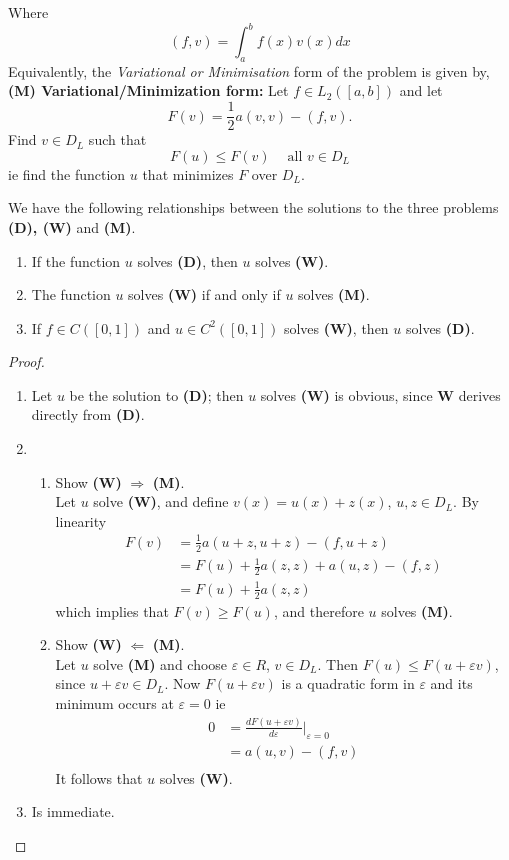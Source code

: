 Where 
\[(f,v) =\int_{a}^{b}f(x)v(x)dx \]
Equivalently, the \textit{Variational or Minimisation} form of the problem is given
by,\\ 
\textbf{(M) Variational/Minimization form:} Let $f\in L_2([a,b])$ and let
\[F(v)=\frac{1}{2}a(v,v)-(f,v).\]
Find $v \in D_L$ such that
\[F(u) \leq F(v) \ \ \ \ \mbox{ all } v\in D_L\]
ie find the function $u$ that minimizes $F$ over $D_L$.
\begin{theorem}
We have the following relationships between the solutions to the three problems
\textbf{(D), (W)} and \textbf{(M)}.
\begin{enumerate}
\item
If the function $u$ solves \textbf{(D)}, then $u$ solves \textbf{(W)}.
\item
The function $u$ solves \textbf{(W)} if and only if $u$ solves \textbf{(M)}.
\item
If $f\in C([0,1])$ and $u \in C^{2}([0,1])$ solves \textbf{(W)}, then $u$ solves \textbf{(D)}.
\end{enumerate}
\end{theorem}
\begin{proof}
\begin{enumerate}
\item
Let $u$ be the solution to \textbf{(D)}; then $u$ solves \textbf{(W)} is obvious,
since \textbf{W} derives directly from \textbf{(D)}.
\item
\begin{enumerate}
\item Show \textbf{(W)} $\Rightarrow$ \textbf{(M)}.\\
Let $u$ solve \textbf{(W)}, and define $v(x)=u(x)+z(x)$, $u,z \in D_L$. By
linearity
\[\begin{array}{ll}
F(v)&=\frac{1}{2}a(u+z,u+z)-(f,u+z)\\
&=F(u)+\frac{1}{2}a(z,z)+a(u,z)-(f,z)\\
&=F(u)+\frac{1}{2}a(z,z)
\end{array}
 \]
which implies that $F(v) \geq F(u)$, and therefore $u$ solves \textbf{(M)}.
\item Show \textbf{(W)} $\Leftarrow$ \textbf{(M)}.\\
Let $u$ solve \textbf{(M)} and choose $ \varepsilon \in R$, $v\in D_L$. 
Then $F(u)\leq F(u+\varepsilon v)$, since $u+\varepsilon v \in D_L$.
Now $F(u+\varepsilon v)$ is a quadratic form in $\varepsilon$ and its minimum occurs at $\varepsilon=0$ ie
\[\begin{array}{ll}
0&=\frac{dF(u+\varepsilon v)}{d \varepsilon}|_{\varepsilon=0}\\
&=a(u,v)-(f,v)\\
\end{array}
\]
It follows that $u$ solves \textbf{(W)}.
\end{enumerate}
\item
Is immediate.
\end{enumerate}
\end{proof}
